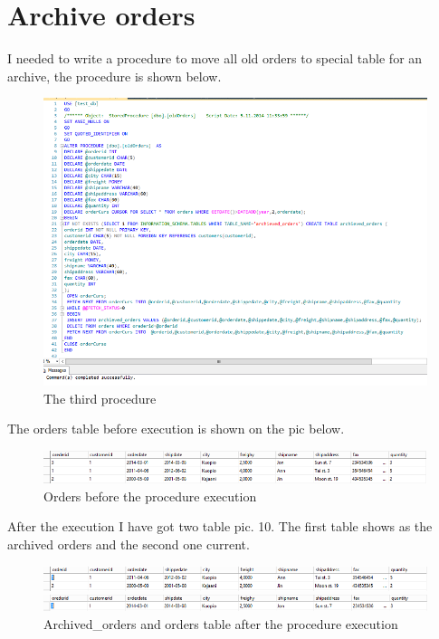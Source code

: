 \documentclass[english]{article}
\begin{document}
\section{Archive orders}
I needed to write a procedure to move all old orders to special table for an archive, the procedure is shown below.
\begin{figure}[H]
\centerline{\includegraphics[scale=0.8]{ProcedureSQL/thirdSourceCOde}}
\caption{The third procedure}
\end{figure}
The orders table before execution is shown on the pic below.  
\begin{figure}[H]
\centerline{\includegraphics[scale=0.8]{ProcedureSQL/orders}}
\caption{Orders before the procedure execution}
\end{figure}
After the execution I have got two table pic. 10. The first table shows as the archived orders and the second one current.
\begin{figure}[H]
\centerline{\includegraphics[scale=0.8]{ProcedureSQL/arc_orders}}
\centerline{\includegraphics[scale=0.8]{ProcedureSQL/ordersafter}}
\caption{Archived\_orders and orders table after the procedure execution}
\end{figure}
\end{document}
